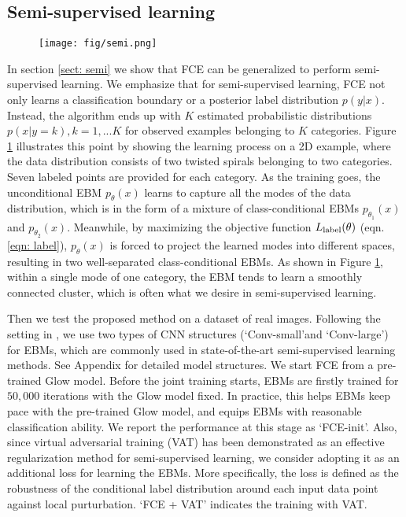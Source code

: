 \documentclass[10pt,twocolumn,letterpaper]{article}
\begin{document}
\subsection{Semi-supervised learning}
\begin{figure*}
\begin{center}
	\texttt{[image: fig/semi.png]}
    \label{fig: semi}
\end{center}
\end{figure*} 
In section \ref{sect: semi} we show that FCE can be generalized to perform semi-supervised learning. We emphasize that for semi-supervised learning, FCE not only learns a classification boundary or a posterior label distribution $p(y|x)$. Instead, the algorithm ends up with $K$ estimated probabilistic distributions $p(x|y=k), k = 1,... K$ for observed examples belonging to $K$ categories. Figure \ref{fig: semi} illustrates this point by showing the learning process on a 2D example, where the data distribution consists of two twisted spirals belonging to two categories. Seven labeled points are provided for each category. As the training goes, the unconditional EBM $p_\theta(x)$ learns to capture all the modes of the data distribution, which is in the form of a mixture of class-conditional EBMs $p_{
\theta_1}(x)$ and $p_{\theta_2}(x)$.  Meanwhile, by maximizing the objective function $L_{\rm label}(\theta)$ (eqn. \ref{eqn: label}), $p_\theta(x)$ is forced to project the learned modes into different spaces, resulting in two well-separated class-conditional EBMs. As shown in Figure \ref{fig: semi}, within a single mode of one category, the EBM tends to learn a smoothly connected cluster, which is often what we desire in semi-supervised learning. 

Then we test the proposed method on a dataset of real images. Following the setting in \cite{miyato2018virtual}, we use two types of CNN structures (\lq Conv-small\rq  and \lq Conv-large\rq) for EBMs, which are commonly used in state-of-the-art semi-supervised learning methods. See Appendix for detailed model structures. We start FCE from a pre-trained Glow model. Before the joint training starts, EBMs are firstly trained for $50,000$ iterations with the Glow model fixed. In practice, this helps EBMs keep pace with the pre-trained Glow model, and equips EBMs with reasonable classification ability. We report the performance at this stage as \lq FCE-init'. Also, since virtual adversarial training (VAT) \cite{miyato2018virtual} has been demonstrated as an effective regularization method for semi-supervised learning, we consider adopting it as an additional loss for learning the EBMs. More specifically, the loss is defined as the robustness of the conditional label distribution around each input data point against local purturbation. \lq FCE + VAT' indicates the training with VAT.
\end{document}

